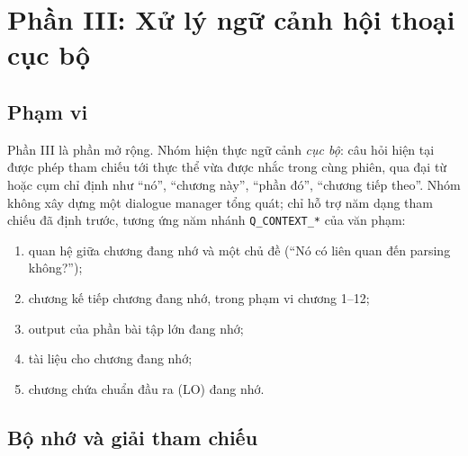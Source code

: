 \section{Phần III: Xử lý ngữ cảnh hội thoại cục bộ}
\label{sec:part3}

\subsection{Phạm vi}

Phần III là phần mở rộng. Nhóm hiện thực ngữ cảnh \emph{cục bộ}: câu hỏi hiện tại được
phép tham chiếu tới thực thể vừa được nhắc trong cùng phiên, qua đại từ hoặc cụm chỉ
định như ``nó'', ``chương này'', ``phần đó'', ``chương tiếp theo''. Nhóm không xây dựng
một dialogue manager tổng quát; chỉ hỗ trợ năm dạng tham chiếu đã định trước, tương ứng
năm nhánh \texttt{Q\_CONTEXT\_*} của văn phạm:
\begin{enumerate}
  \item quan hệ giữa chương đang nhớ và một chủ đề (``Nó có liên quan đến parsing
        không?'');
  \item chương kế tiếp chương đang nhớ, trong phạm vi chương 1--12;
  \item output của phần bài tập lớn đang nhớ;
  \item tài liệu cho chương đang nhớ;
  \item chương chứa chuẩn đầu ra (LO) đang nhớ.
\end{enumerate}

\subsection{Bộ nhớ và giải tham chiếu}


